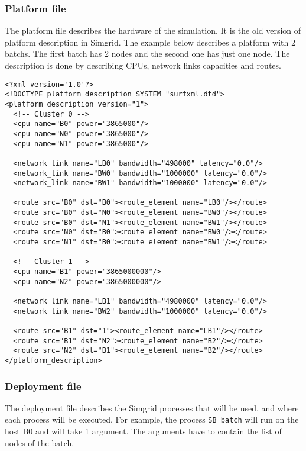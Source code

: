 \subsubsection{Platform file}
\label{subsubsec:PFfile}

The platform file describes the hardware of the simulation. It is the
old version of platform description in Simgrid. The example below
describes a platform with 2 batchs. The first batch has 2 nodes and
the second one has just one node. The description is done by
describing CPUs, network links capacities and routes.

{\small
\begin{verbatim}
<?xml version='1.0'?>
<!DOCTYPE platform_description SYSTEM "surfxml.dtd">
<platform_description version="1">
  <!-- Cluster 0 -->
  <cpu name="B0" power="3865000"/>
  <cpu name="N0" power="3865000"/>
  <cpu name="N1" power="3865000"/>

  <network_link name="LB0" bandwidth="498000" latency="0.0"/>
  <network_link name="BW0" bandwidth="1000000" latency="0.0"/>
  <network_link name="BW1" bandwidth="1000000" latency="0.0"/>
  
  <route src="B0" dst="B0"><route_element name="LB0"/></route>
  <route src="B0" dst="N0"><route_element name="BW0"/></route>
  <route src="B0" dst="N1"><route_element name="BW1"/></route>
  <route src="N0" dst="B0"><route_element name="BW0"/></route>
  <route src="N1" dst="B0"><route_element name="BW1"/></route>

  <!-- Cluster 1 -->
  <cpu name="B1" power="3865000000"/>
  <cpu name="N2" power="3865000000"/>
  
  <network_link name="LB1" bandwidth="4980000" latency="0.0"/>
  <network_link name="BW2" bandwidth="1000000" latency="0.0"/>
  
  <route src="B1" dst="1"><route_element name="LB1"/></route>  
  <route src="B1" dst="N2"><route_element name="B2"/></route>  
  <route src="N2" dst="B1"><route_element name="B2"/></route>
</platform_description>
\end{verbatim}}

\subsubsection{Deployment file}
\label{subsubsec:DEPfile}

The deployment file describes the Simgrid processes that will be used,
and where each process will be executed. For example, the process
\verb+SB_batch+ will run on the host B0 and will take 1 argument. The
arguments have to contain the list of nodes of the batch.

